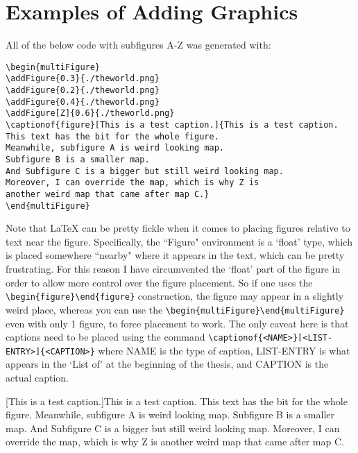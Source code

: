 \section{Examples of Adding Graphics}
\label{Sec:addingGraphics}
All of the below code with subfigures A-Z was generated with:
\begin{verbatim}
\begin{multiFigure}
\addFigure{0.3}{./theworld.png}
\addFigure{0.2}{./theworld.png}
\addFigure{0.4}{./theworld.png}
\addFigure[Z]{0.6}{./theworld.png}
\captionof{figure}[This is a test caption.]{This is a test caption. 
This text has the bit for the whole figure. 
Meanwhile, subfigure A is weird looking map. 
Subfigure B is a smaller map. 
And Subfigure C is a bigger but still weird looking map. 
Moreover, I can override the map, which is why Z is 
another weird map that came after map C.}
\end{multiFigure}
\end{verbatim}
Note that \LaTeX{} can be pretty fickle when it comes to placing figures relative to text near the figure. Specifically, the ``Figure" environment is a `float' type, which is placed somewhere ``nearby" where it appears in the text, which can be pretty frustrating. For this reason I have circumvented the `float' part of the figure in order to allow more control over the figure placement. So if one uses the \verb|\begin{figure}\end{figure}| construction, the figure may appear in a slightly weird place, whereas you can use the \verb|\begin{multiFigure}\end{multiFigure}| even with only 1 figure, to force placement to work. The only caveat here is that captions need to be placed using the command \verb|\captionof{<NAME>}[<LIST-ENTRY>]{<CAPTION>}| where NAME is the type of caption, LIST-ENTRY is what appears in the `List of' at the beginning of the thesis, and CAPTION is the actual caption.

\begin{multiFigure}
[This is a test caption.]{This is a test caption. This text has the bit for the whole figure. Meanwhile, subfigure A is weird looking map. Subfigure B is a smaller map. And Subfigure C is a bigger but still weird looking map. Moreover, I can override the map, which is why Z is another weird map that came after map C.}
\end{multiFigure}

